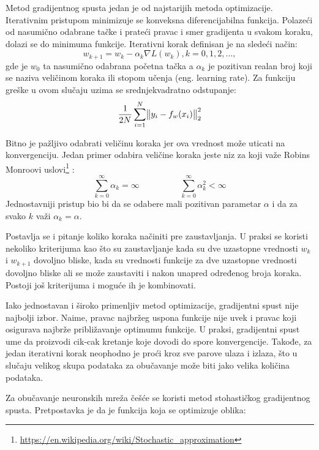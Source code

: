 Metod gradijentnog spusta jedan je od najstarijih metoda  optimizacije. Iterativnim pristupom minimizuje se konveksna diferencijabilna funkcija. Polazeći od nasumično odabrane tačke i prateći pravac i smer gradijenta u svakom koraku, dolazi se do minimuma funkcije. Iterativni korak definisan je na sledeći način:
\begin{equation}
	\label{eq:gradijentni_spust}
	w_{k+1} = w_k - \alpha_k \nabla L(w_k), k=0, 1, 2, ... ,
\end{equation}
gde je $w_0$ ta nasumično odabrana početna tačka a $\alpha_k$ je pozitivan realan broj koji se naziva veličinom koraka ili stopom učenja (eng. learning rate). 
Za funkciju greške u ovom slučaju uzima se srednjekvadratno odstupanje:
\begin{equation}
	\frac{1}{2N}\sum_{i=1}^{N} \norm{y_i - f_w(x_i)}_2^2
\end{equation}

Bitno je pažljivo odabrati veličinu koraka jer ova vrednost može uticati na konvergenciju. Jedan primer odabira veličine koraka jeste niz za koji važe Robins Monroovi uslovi\footnote{\url{https://en.wikipedia.org/wiki/Stochastic_approximation}} :
\begin{equation}
	 \sum_{k=0}^{\infty} \alpha_k = \infty \hspace{2cm} \sum_{k=0}^{\infty} \alpha_k^2 < \infty 
	\end{equation}
Jednostavniji pristup bio bi da se odabere mali pozitivan parametar $\alpha$ i da za svako $k$ važi $\alpha_k = \alpha$.
\par
Postavlja se i pitanje koliko koraka načiniti pre zaustavljanja. U praksi se koristi nekoliko kriterijuma kao što su zaustavljanje kada su dve uzastopne vrednosti $w_k$ i $w_{k+1}$ dovoljno bliske, kada su vrednosti funkcije za dve uzastopne vrednosti dovoljno bliske ali se može zaustaviti i nakon unapred određenog broja koraka. Postoji još kriterijuma i moguće ih je kombinovati.
\par
Iako jednostavan i široko primenljiv metod optimizacije, gradijentni spust nije najbolji izbor. Naime, pravac najbržeg uspona funkcije nije uvek i pravac koji osigurava najbrže približavanje optimumu funkcije. U praksi, gradijentni spust ume da proizvodi cik-cak kretanje koje dovodi do spore konvergencije. Takođe, za jedan iterativni korak neophodno je proći kroz sve parove ulaza i izlaza, što u slučaju velikog skupa podataka za obučavanje može biti jako velika količina podataka.
\par
Za obučavanje neuronskih mreža češće se koristi metod stohastičkog gradijentnog spusta. Pretpostavka je da je funkcija koja se optimizuje oblika:

